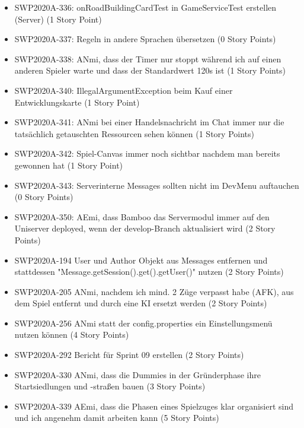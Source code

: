 \documentclass[12pt,a4paper, oneside]{article}
\begin{document}
\begin{itemize}
        \item SWP2020A-336: onRoadBuildingCardTest in GameServiceTest erstellen (Server) (1 Story Point)

        \item SWP2020A-337: Regeln in andere Sprachen übersetzen (0 Story Points)

        \item SWP2020A-338: ANmi, dass der Timer nur stoppt während ich auf einen anderen Spieler warte und dass der Standardwert 120s ist (1 Story Points)

        \item SWP2020A-340: IllegalArgumentException beim Kauf einer Entwicklungskarte (1 Story Point)

        \item SWP2020A-341: ANmi bei einer Handelsnachricht im Chat immer nur die tatsächlich getauschten Ressourcen sehen können (1 Story Points)

        \item SWP2020A-342: Spiel-Canvas immer noch sichtbar nachdem man bereits gewonnen hat (1 Story Point)

        \item SWP2020A-343: Serverinterne Messages sollten nicht im DevMenu auftauchen (0 Story Points)

        \item SWP2020A-350: AEmi, dass Bamboo das Servermodul immer auf den Uniserver deployed, wenn der develop-Branch aktualisiert wird (2 Story Points)

        \item SWP2020A-194 User und Author Objekt aus Messages entfernen und stattdessen "Message.getSession().get().getUser()" nutzen (2 Story Points)

        \item SWP2020A-205 ANmi, nachdem ich mind. 2 Züge verpasst habe (AFK), aus dem Spiel entfernt und durch eine KI ersetzt werden (2 Story Points)

        \item SWP2020A-256 ANmi statt der config.properties ein Einstellungsmenü nutzen können (4 Story Points)

        \item SWP2020A-292 Bericht für Sprint 09 erstellen (2 Story Points)

        \item SWP2020A-330 ANmi, dass die Dummies in der Gründerphase ihre Startsiedlungen und -straßen bauen (3 Story Points)

        \item SWP2020A-339 AEmi, dass die Phasen eines Spielzuges klar organisiert sind und ich angenehm damit arbeiten kann (5 Story Points)


    \end{itemize}
\end{document}
